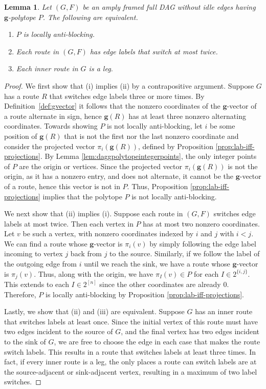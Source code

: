 \documentclass[12pt]{amsart}
\newtheorem{lemma}[theorem]{Lemma}
\theoremstyle{definition}
\newcommand\bg{\mathbf{g}}
\begin{document}
\begin{lemma}\label{lem:lab-iff-<3switch} 
Let $(G,F)$ be an amply framed full DAG without idle edges having $\bg$-polytope $P$.
The following are equivalent.
    \begin{enumerate}[label=(\roman*)]
        \item $P$ is locally anti-blocking.
        \item Each route in $(G,F)$ has edge labels that switch at most twice.
        \item Each inner route in $G$ is a leg.
    \end{enumerate}
\end{lemma}
\begin{proof}
We first show that (i) implies (ii) by a contrapositive argument.
Suppose $G$ has a route $R$ that switches edge labels three or more times. 
By Definition~\ref{def:gvector} it follows that the nonzero coordinates of the $\bg$-vector of a route alternate in sign, hence $\bg(R)$ has at least three nonzero alternating coordinates. 
Towards showing $P$ is not locally anti-blocking, let $i$ be some position of $\bg(R)$ that is not the first nor the last nonzero coordinate and consider the projected vector $\pi_i(\bg(R))$, defined by Proposition \ref{prop:lab-iff-projections}. 
By Lemma \ref{lem:daggpolytopeintegerpoints}, the only integer points of $P$ are the origin or vertices. 
Since the projected vector $\pi_i(\bg(R))$ is not the origin, as it has a nonzero entry, and does not alternate, it cannot be the $\bg$-vector of a route, hence this vector is not in $P$.
Thus, Proposition \ref{prop:lab-iff-projections} implies that the polytope $P$ is not locally anti-blocking.

We next show that (ii) implies (i).
Suppose each route in $(G,F)$ switches edge labels at most twice.
Then each vertex in $P$ has at most two nonzero coordinates.
Let $v$ be such a vertex, with nonzero coordinates indexed by $i$ and $j$ with $i<j$.
We can find a route whose $\bg$-vector is $\pi_i(v)$ by simply following the edge label incoming to vertex $j$ back from $j$ to the source.
Similarly, if we follow the label of the outgoing edge from $i$ until we reach the sink, we have a route whose $\bg$-vector is $\pi_j(v)$.
Thus, along with the origin, we have $\pi_I(v)\in P$ for each $I\in 2^{\{i,j\}}$.
This extends to each $I\in 2^{[n]}$ since the other coordinates are already 0.
Therefore, $P$ is locally anti-blocking by Proposition \ref{prop:lab-iff-projections}.

Lastly, we show that (ii) and (iii) are equivalent.
Suppose $G$ has an inner route that switches labels at least once. 
Since the initial vertex of this route must have two edges incident to the source of $G$, and the final vertex has two edges incident to the sink of $G$, we are free to choose the edge in each case that makes the route switch labels.
This results in a route that switches labels at least three times.
In fact, if every inner route is a leg, the only places a route can switch labels are at the source-adjacent or sink-adjacent vertex, resulting in a maximum of two label switches.
\end{proof}
\end{document}

